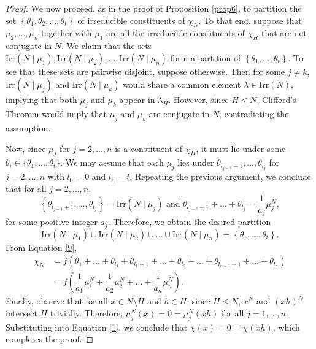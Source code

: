 \documentclass[10pt,a4paper]{amsart}
\newcommand{\Irr}{\mathrm {Irr}}
\begin{document}
\begin{proof}
	We now proceed, as in the proof of  Proposition \ref{prop6}, to partition   the set $\left\{\theta_1,\theta_2,\ldots,\theta_t\right\}$ of irreducible constituents  of $\chi_N$. To that end, suppose that  $\mu_2,\ldots,\mu_n$ together with $\mu_1$ are all the irreducible constituents of $\chi_H$ that are not conjugate in $N$. We claim that  the sets $\Irr(N\mid \mu_1),\Irr(N\mid\mu_2),\ldots,\Irr(N\mid \mu_n)$ form a partition of $\left\{\theta_1,\ldots,\theta_t\right\}$. To see that these sets are pairwise disjoint, suppose otherwise. Then for some $j\neq k$, $\Irr(N\mid\mu_j)$ and $\Irr(N\mid \mu_k)$ would share a common element $\lambda\in\Irr(N)$, implying that both $\mu_j$ and $\mu_k$ appear in $\lambda_H$. However, since $H\unlhd N$, Clifford's Theorem would imply that $\mu_j$ and $\mu_k$ are conjugate in $N$, contradicting the assumption. 
	
	Now, since $\mu_j$ for $j=2,\ldots,n$ is a constituent of $\chi_H$, it must  lie under some $\theta_i\in \{\theta_1,\dots,\theta_t\}$. We may assume  that each $\mu_j$ lies under $\theta_{l_{j-1}+1},\ldots,\theta_{l_{j}}$ for $j=2,\ldots,n$ with $l_0=0$ and ${l_n} = t$. Repeating the previous argument, we conclude that for all $j=2,\ldots,n$, $$\left\{\theta_{l_{j-1}+1},\ldots,\theta_{l_j}\right\} = \Irr(N\mid \mu_j)\text{ and }
	\theta_{l_{j-1}+1} + \ldots + \theta_{l_j} = \dfrac{1}{a_j}\mu_j^N,$$
	for some positive integer $a_j$. Therefore, we obtain the desired partition $$\Irr(N\mid \mu_1)\cup \Irr(N\mid \mu_2)\cup \ldots\cup\Irr(N\mid\mu_n)=\left\{\theta_1,\ldots,\theta_t\right\}.$$ From Equation \eqref{9}, 
	 	\begin{align}\label{1}
		\chi_N &= f (\theta_1+ \ldots +\theta_{l_1} + \theta_{l_1+1}+\ldots + \theta_{l_2} + \ldots + \theta_{l_{n-1}+1} + \ldots +\theta_{l_n}) \nonumber\\
		& = f\left(\dfrac{1}{a_1}\mu_1^N + \dfrac{1}{a_2}\mu_2^N  + \ldots + \dfrac{1}{a_n}\mu_n^N\right).
	\end{align} 
	Finally, observe that for all  $x\in N\setminus H$ and  $h\in H$, since $H\unlhd N$, $x^N$ and $(xh)^N$ intersect $H$ trivially. Therefore, $\mu_j^N(x) = 0 = \mu_j^N(xh)$  for all $j=1,\ldots,n$. Substituting into Equation \eqref{1}, we conclude that $\chi(x) = 0=\chi(xh)$, which completes the proof. 
\end{proof}
\end{document}
